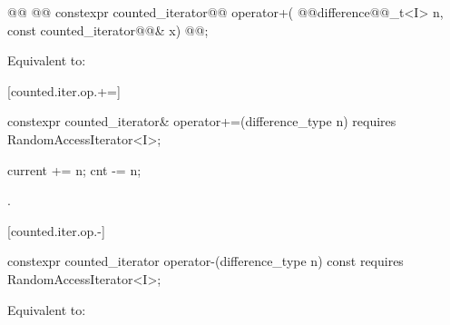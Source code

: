 \begin{addedblock}
%
%
\begin{itemdecl}
@@
  @@ constexpr counted_iterator@@ operator+(
    @@difference@@_t<I> n, const counted_iterator@@& x)
      @@;
\end{itemdecl}

\begin{itemdescr}
\pnum
{}

\pnum
\effects Equivalent to:
\end{itemdescr}

[counted.iter.op.+=]{}

%
%
\begin{itemdecl}
  constexpr counted_iterator& operator+=(difference_type n)
    requires RandomAccessIterator<I>;
\end{itemdecl}

\begin{itemdescr}
\pnum
\oldtxt{\requires} \newtxt{\expects}

\pnum
\effects
\begin{codeblock}
current += n;
cnt -= n;
\end{codeblock}

\pnum
\returns {}.
\end{itemdescr}

[counted.iter.op.-]{}

%
%
\begin{itemdecl}
  constexpr counted_iterator operator-(difference_type n) const
    requires RandomAccessIterator<I>;
\end{itemdecl}

\begin{itemdescr}
\pnum
\oldtxt{\requires} \newtxt{\expects}

\pnum
\effects Equivalent to:
\end{itemdescr}


\end{addedblock}
